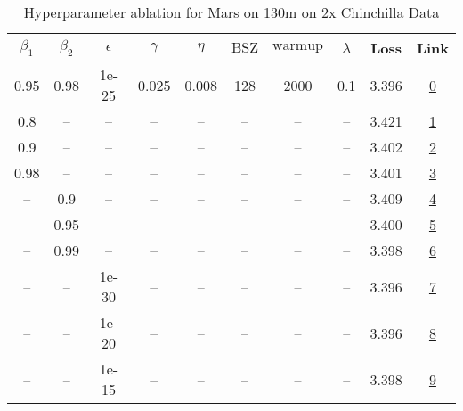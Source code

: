 \begin{table}[H]
\centering
\caption{Hyperparameter ablation for Mars on 130m on 2x Chinchilla Data}
\label{tab:ablation_mars_130m_2}
\begin{tabular}{cccccccccc}
\toprule
$\beta_1$ & $\beta_2$ & $\epsilon$ & $\gamma$ & $\eta$ & $\mathrm{BSZ}$ & $\mathrm{warmup}$ & $\lambda$ & Loss & Link \\
\midrule
0.95 & 0.98 & 1e-25 & 0.025 & 0.008 & 128 & 2000 & 0.1 & 3.396 & \href{https://wandb.ai/stanford-mercury/optimizer-scaling/runs/sweep-130m-5B-marsc95aa3lr0.008-wd0.1-minlr0-warmup2000-b10.95-b-7a23c5}{0} \\
\midrule
0.8 & -- & -- & -- & -- & -- & -- & -- & 3.421 & \href{https://wandb.ai/stanford-mercury/optimizer-scaling/runs/sweep-130m-5B-marscd02f0lr0.008-wd0.1-minlr0-warmup2000-b10.8-b2-4592bf}{1} \\
0.9 & -- & -- & -- & -- & -- & -- & -- & 3.402 & \href{https://wandb.ai/stanford-mercury/optimizer-scaling/runs/sweep-130m-5B-marspfd075dlr0.008-wd0.1-minlr0-warmup2000-b10.9-b-b40465}{2} \\
0.98 & -- & -- & -- & -- & -- & -- & -- & 3.401 & \href{https://wandb.ai/stanford-mercury/optimizer-scaling/runs/sweep-130m-5B-marsc8034dlr0.008-wd0.1-minlr0-warmup2000-b10.98-b-a89aca}{3} \\
-- & 0.9 & -- & -- & -- & -- & -- & -- & 3.409 & \href{https://wandb.ai/stanford-mercury/optimizer-scaling/runs/sweep-130m-5B-mars58007elr0.008-wd0.1-minlr0-warmup2000-b10.95-b-a6ce83}{4} \\
-- & 0.95 & -- & -- & -- & -- & -- & -- & 3.400 & \href{https://wandb.ai/stanford-mercury/optimizer-scaling/runs/sweep-130m-5B-marspa9b599lr0.008-wd0.1-minlr0-warmup2000-b10.95--0ab9b0}{5} \\
-- & 0.99 & -- & -- & -- & -- & -- & -- & 3.398 & \href{https://wandb.ai/stanford-mercury/optimizer-scaling/runs/sweep-130m-5B-mars104ea4lr0.008-wd0.1-minlr0-warmup2000-b10.95-b-ce96d6}{6} \\
-- & -- & 1e-30 & -- & -- & -- & -- & -- & 3.396 & \href{https://wandb.ai/stanford-mercury/optimizer-scaling/runs/sweep-130m-5B-marsc95aa3lr0.008-wd0.1-minlr0-warmup2000-b10.95-b-7a23c5}{7} \\
-- & -- & 1e-20 & -- & -- & -- & -- & -- & 3.396 & \href{https://wandb.ai/stanford-mercury/optimizer-scaling/runs/sweep-130m-5B-marsfe50f8lr0.008-wd0.1-minlr0-warmup2000-b10.95-b-93f048}{8} \\
-- & -- & 1e-15 & -- & -- & -- & -- & -- & 3.398 & \href{https://wandb.ai/stanford-mercury/optimizer-scaling/runs/sweep-130m-5B-mars773994lr0.008-wd0.1-minlr0-warmup2000-b10.95-b-402a1d}{9} \\

\end{tabular}
\end{table}
